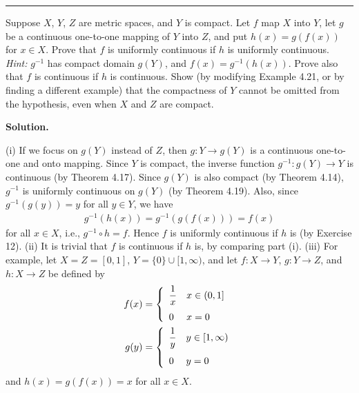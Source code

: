 \documentclass[12pt]{article}
\theoremstyle{definition}
\begin{document}
\bigskip\noindent\hrule\bigskip

Suppose $X$, $Y$, $Z$ are metric spaces, and $Y$ is compact. Let $f$ map $X$ into $Y$, let $g$ be a continuous one-to-one mapping of $Y$ into $Z$, and put $h(x)=g(f(x))$ for $x\in X$.
Prove that $f$ is uniformly continuous if $h$ is uniformly continuous.
\textit{Hint:} $g^{-1}$ has compact domain $g(Y)$, and $f(x)=g^{-1}(h(x))$.
Prove also that $f$ is continuous if $h$ is continuous.
Show (by modifying Example 4.21, or by finding a different example) that the compactness of $Y$ cannot be omitted from the hypothesis, even when $X$ and $Z$ are compact.

\smallskip
\noindent\textbf{Solution.}\quad

(i) If we focus on $g(Y)$ instead of $Z$, then $g:Y\to g(Y)$ is a continuous one-to-one and onto mapping. Since $Y$ is compact, the inverse function $g^{-1}:g(Y)\to Y$ is continuous (by Theorem 4.17). Since $g(Y)$ is also compact (by Theorem 4.14), $g^{-1}$ is uniformly continuous on $g(Y)$ (by Theorem 4.19). Also, since $g^{-1}(g(y))=y$ for all $y\in Y$, we have
\begin{align*}
g^{-1}(h(x))=g^{-1}(g(f(x)))=f(x)
\end{align*}
for all $x\in X$, i.e., $g^{-1}\circ h=f$. Hence $f$ is uniformly continuous if $h$ is (by Exercise 12).
(ii) It is trivial that $f$ is continuous if $h$ is, by comparing part (i).
(iii) For example, let $X=Z=[0,1]$, $Y=\{0\}\cup[1,\infty)$, and let $f:X\to Y$, $g:Y\to Z$, and $h:X\to Z$ be defined by
\begin{align*}
f(x)&=\left\{\begin{array}{ll}
\dfrac{1}{x}&x\in(0,1]\vspace{0.1in}\\
0&x=0
\end{array}\right. \\
g(y)&=\left\{\begin{array}{ll}
\dfrac{1}{y}&y\in[1,\infty)\vspace{0.1in}\\
0&y=0
\end{array}\right.
\end{align*}
and $h(x)=g(f(x))=x$ for all $x\in X$.
\end{document}
